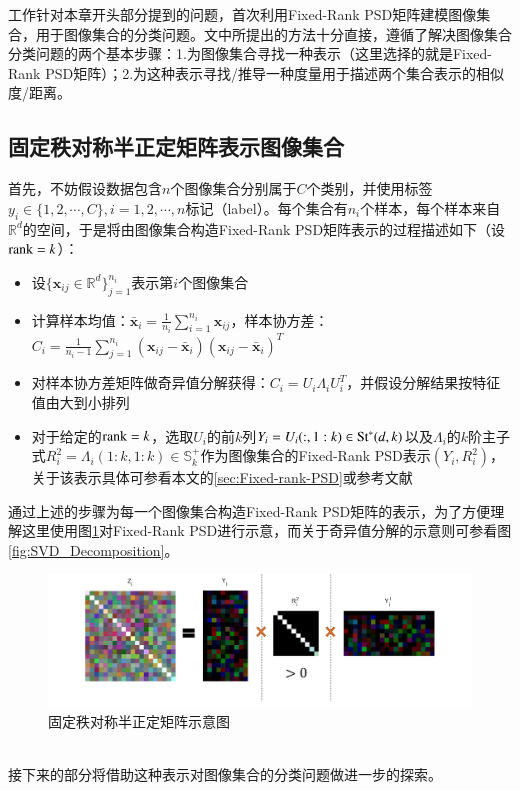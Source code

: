 工作\cite{PSD_WACV}针对本章开头部分提到的问题，首次利用Fixed-Rank PSD矩阵建模图像集合，用于图像集合的分类问题。文中所提出的方法十分直接，遵循了解决图像集合分类问题的两个基本步骤：1.为图像集合寻找一种表示（这里选择的就是Fixed-Rank PSD矩阵）；2.为这种表示寻找/推导一种度量用于描述两个集合表示的相似度/距离。
\subsection{固定秩对称半正定矩阵表示图像集合}
\label{sec:Fixed_Rank_PSD_repr_Imageset}
首先，不妨假设数据包含$n$个图像集合分别属于$C$个类别，并使用标签$y_{i}\in\{1,2,\cdots,C\},i=1,2,\cdots,n$标记（label）。每个集合有$n_i$个样本，每个样本来自$\mathbb{R}^{d}$的空间，于是将由图像集合构造Fixed-Rank PSD矩阵表示的过程描述如下（设${\rm rank}=k$）：
\begin{itemize}
\label{construct_fixed_rank_PSD}
\item 设$\{\bm{x}_{ij} \in \mathbb{R}^{d}\}_{j=1}^{n_i}$表示第$i$个图像集合
\item 计算样本均值：$\bar{\bm{x}}_i=\frac{1}{n_i}\sum_{i=1}^{n_i} \bm{x}_{ij}$，样本协方差：$C_i=\frac{1}{n_i-1}\sum_{j=1}^{n_i}(\bm{x}_{ij}-\bar{\bm{x}}_i)(\bm{x}_{ij}-\bar{\bm{x}}_i)^{T}$
\item 对样本协方差矩阵做奇异值分解获得：$C_i=U_i\Lambda_iU_{i}^{T}$，并假设分解结果按特征值由大到小排列
\item 对于给定的${\rm rank}=k$，选取$U_i$的前$k$列$Y_i=U_i(:,1:k)\in {\rm St}^{*}(d,k)$以及$\Lambda_i$的$k$阶主子式$R_{i}^{2}=\Lambda_{i}(1:k,1:k)\in \mathbb{S}_{k}^{+}$作为图像集合的Fixed-Rank PSD表示$(Y_i,R_{i}^{2})$，关于该表示具体可参看本文的\ref{sec:Fixed-rank-PSD}或参考文献\cite{PSD_Riemannian}
\end{itemize}
通过上述的步骤为每一个图像集合构造Fixed-Rank PSD矩阵的表示，为了方便理解这里使用图\ref{fig:FRPSD}对Fixed-Rank PSD进行示意，而关于奇异值分解的示意则可参看图\ref{fig:SVD_Decomposition}。
\begin{figure}[hbt]
	\centering
	\includegraphics[width=\linewidth]{source/FRPSD.png}
	\caption{固定秩对称半正定矩阵示意图}
	\label{fig:FRPSD}
\end{figure}\\
接下来的部分将借助这种表示对图像集合的分类问题做进一步的探索。
